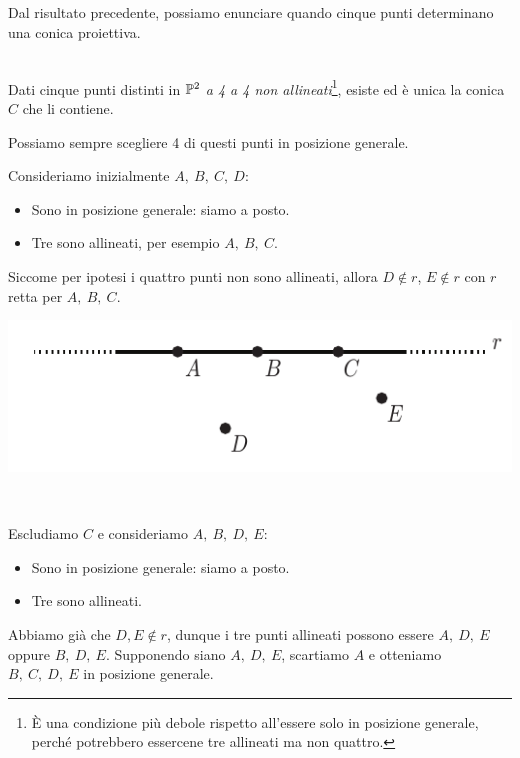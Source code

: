 Dal risultato precedente, possiamo enunciare quando cinque punti determinano una conica proiettiva.
\begin{proposition}~{}\\
	Dati cinque punti distinti in $\proj[2]{\ }$ \textit{a 4 a 4 non allineati}\footnote{È una condizione più debole rispetto all'essere solo in posizione generale, perché potrebbero essercene tre allineati ma non quattro.}, esiste ed è unica la conica $C$ che li contiene.
\end{proposition}
\begin{demonstration}
	Possiamo sempre scegliere 4 di questi punti in posizione generale.\\
	\begin{minipage}{0.69\textwidth}
	Consideriamo inizialmente $A,\ B,\ C,\ D$:
	\begin{itemize}
	\item Sono in posizione generale: siamo a posto.
	\item Tre sono allineati, per esempio $A,\ B,\ C$.
	\end{itemize}
	Siccome per ipotesi i quattro punti non sono allineati, allora $D\notin r$, $E\notin r$ con $r$ retta per $A,\ B,\ C$.
	\end{minipage}
	\begin{minipage}{0.3\textwidth}
		\includegraphics[trim=0cm 0cm 0cm 0cm,clip,scale=0.50]{images/fivepointconic1.pdf}
	\end{minipage}\\
	\begin{minipage}{0.69\textwidth}
	Escludiamo $C$ e consideriamo $A,\ B,\ D,\ E$:
	\begin{itemize}
		\item Sono in posizione generale: siamo a posto.
		\item Tre sono allineati.
	\end{itemize}
	Abbiamo già che $D,E \notin r$, dunque i tre punti allineati possono essere $A,\ D,\ E$ oppure $B,\ D,\ E$. Supponendo siano $A,\ D,\ E$, scartiamo $A$ e otteniamo $B,\ C,\ D,\ E$ in posizione generale.

\end{minipage}
\end{demonstration}
